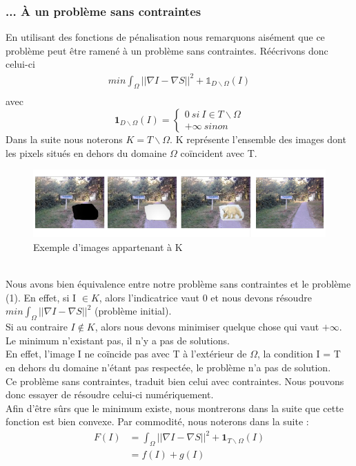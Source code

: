 \subsubsection{... À un problème sans contraintes}
En utilisant des fonctions de pénalisation nous remarquons aisément que ce problème peut être ramené à un problème sans contraintes. Réécrivons donc celui-ci 
\begin{equation*}
\begin{aligned}{}
    min \int_\Omega ||\nabla I - \nabla S||^2 + \mathbb{1} _{D \backslash \Omega } (I) \\
    \end{aligned}
\end{equation*}{}
avec 
\begin{equation*}
\mathbf{1}_{ D \backslash \Omega }(I) =
	\left\{
	\begin{aligned}{}
	0 \ si\  I \in T \backslash \Omega \\
	+ \infty \ sinon
    \end{aligned}
    \right.
\end{equation*}{}
Dans la suite nous noterons $K = T\backslash \Omega$. K représente l'ensemble des images dont les pixels situés en dehors du domaine $\Omega$ coïncident avec T.\\
\begin{figure}[!h]
\centering
\includegraphics[scale=0.5]{Images/K.png}
\caption{Exemple d'images appartenant à K}
\end{figure}
\\
Nous avons bien équivalence entre notre problème sans contraintes et le problème (1). En effet, si I $\in K$, alors l'indicatrice vaut 0 et nous devons résoudre $min \int_\Omega ||\nabla I - \nabla S||^2 $ (problème initial). \\
Si au contraire $I \notin K$, alors nous devons minimiser quelque chose qui vaut $+\infty$. Le minimum n'existant pas, il n'y a pas de solutions.\\
En effet, l'image I ne coïncide pas avec T à l'extérieur de $\Omega$,  la condition I = T en dehors du domaine n'étant pas respectée, le problème n'a pas de solution. \\
 Ce problème sans contraintes, traduit bien celui avec contraintes. Nous pouvons donc essayer de résoudre celui-ci numériquement.\\ Afin d'être sûrs que le minimum existe, nous montrerons dans la suite que cette fonction est bien convexe. 
 Par commodité, nous noterons dans la suite : 
 \begin{equation*}
 \begin{aligned}
 F(I) &=   \int_\Omega ||\nabla I - \nabla S||^2 + \mathbf{1} _{T\backslash \Omega } (I) \\
 & = f(I)+ g(I)
 \end{aligned}
 \end{equation*}
